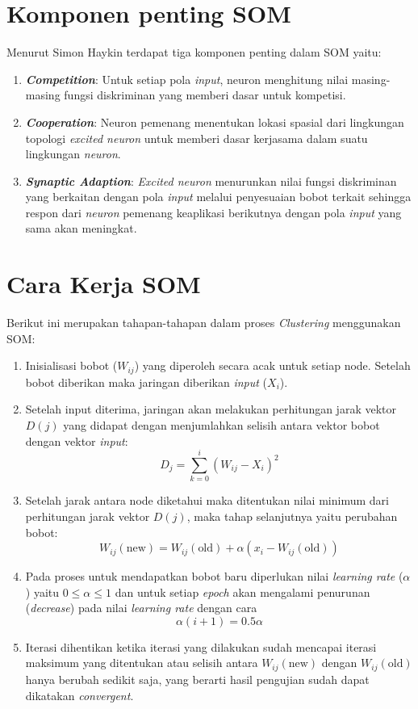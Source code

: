 \section{Komponen penting SOM}

Menurut Simon Haykin terdapat tiga komponen penting dalam SOM yaitu:

\begin{enumerate}
	\item \textbf{\textit{Competition}}: Untuk setiap pola \textit{input}, neuron menghitung nilai masing-masing fungsi diskriminan yang memberi dasar untuk kompetisi.
	\item \textbf{\textit{Cooperation}}: Neuron pemenang menentukan lokasi spasial dari lingkungan topologi \textit{excited neuron} untuk memberi dasar kerjasama dalam suatu lingkungan \textit{neuron}.
	\item \textbf{\textit{Synaptic Adaption}}:\textit{ Excited neuron} menurunkan nilai fungsi diskriminan yang berkaitan dengan pola \textit{input} melalui penyesuaian bobot terkait sehingga respon dari \textit{neuron} pemenang keaplikasi berikutnya dengan pola \textit{input} yang sama akan meningkat.
\end{enumerate}

\section{Cara Kerja SOM}

Berikut   ini    merupakan    tahapan-tahapan    dalam    proses    \textit{Clustering} menggunakan SOM:

\begin{enumerate}
	\item Inisialisasi bobot ($W_{ij}$) yang diperoleh secara acak untuk setiap node. 
	Setelah bobot diberikan maka jaringan diberikan \textit{input} ($X_i$).
	
	\item Setelah input diterima, jaringan akan melakukan perhitungan jarak vektor $D(j)$ 
	yang didapat dengan menjumlahkan selisih antara vektor bobot dengan vektor \textit{input}:
	\[
	D_j = \sum_{k=0}^{i} (W_{ij} - X_i)^2
	\]
	
	\item Setelah jarak antara node diketahui maka ditentukan nilai minimum dari 
	perhitungan jarak vektor $D(j)$, maka tahap selanjutnya yaitu perubahan bobot:
	\[
	W_{ij}(\text{new}) = W_{ij}(\text{old}) + \alpha (x_i - W_{ij}(\text{old}))
	\]
	
	\item Pada proses untuk mendapatkan bobot baru diperlukan nilai \textit{learning rate} 
	($\alpha$) yaitu $0 \leq \alpha \leq 1$ dan untuk setiap \textit{epoch} akan mengalami penurunan 
	(\textit{decrease}) pada nilai \textit{learning rate} dengan cara 
	\[
	\alpha(i+1) = 0.5 \alpha
	\]
	
	\item Iterasi dihentikan ketika iterasi yang dilakukan sudah mencapai iterasi maksimum 
	yang ditentukan atau selisih antara $W_{ij}(\text{new})$ dengan $W_{ij}(\text{old})$ 
	hanya berubah sedikit saja, yang berarti hasil pengujian sudah dapat dikatakan 
	\textit{convergent}.
\end{enumerate}

